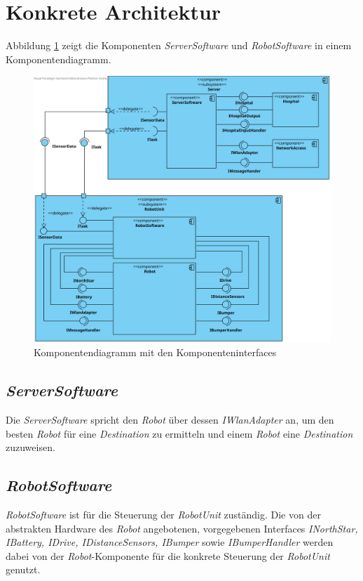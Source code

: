 \section{Konkrete Architektur}

Abbildung \ref{KomponentendiagrammKonkret} zeigt die Komponenten \emph{ServerSoftware} und \emph{RobotSoftware} in einem Komponentendiagramm.

\begin{figure}[H]
\centering
\includegraphics[width=1\textwidth]{img/1-Entwurf-4-KonkreteArchitektur}
\caption{Komponentendiagramm mit den Komponenteninterfaces}
\label{KomponentendiagrammKonkret}
\end{figure}

\subsection{\textit{ServerSoftware}}

Die \emph{ServerSoftware} spricht den \textit{Robot} über dessen \textit{IWlanAdapter} an,
um den besten \textit{Robot} für eine \textit{Destination} zu ermitteln und einem \textit{Robot} eine \textit{Destination} zuzuweisen.

\subsection{\textit{RobotSoftware}}

\emph{RobotSoftware} ist für die Steuerung der \textit{RobotUnit} zuständig. 
Die von der abstrakten Hardware
des \textit{Robot} angebotenen, vorgegebenen Interfaces \textit{INorthStar, IBattery, IDrive, IDistanceSensors, IBumper} sowie
\textit{IBumperHandler} werden dabei von der \textit{Robot}-Komponente für die konkrete Steuerung der \textit{RobotUnit} genutzt.
